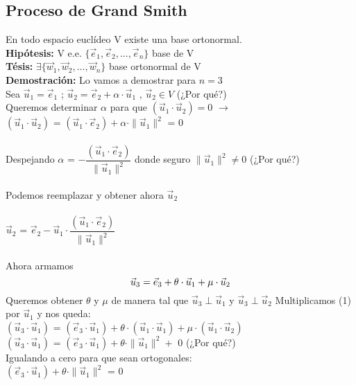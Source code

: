 \documentclass[11pt]{article}
\begin{document}
\subsection{Proceso de Grand Smith}
En todo espacio euclídeo V existe una base ortonormal.\\
\textbf{Hipótesis:} V e.e. $\{\vec{e}_1, \vec{e}_2, \hdots, \vec{e}_n\}$ base de V \\
\textbf{Tésis:} $\exists \{\vec{w}_1, \vec{w}_2, \hdots, \vec{w}_n\}$ base ortonormal de V\\
\textbf{Demostración:} Lo vamos a demostrar para $n=3$\\
Sea $\vec{u}_1 = \vec{e}_1$ ; $\vec{u}_2 = \vec{e}_2 + \alpha\cdot\vec{u}_1$ , $\vec{u}_2 \in V$ (¿Por qué?)\\
Queremos determinar $\alpha$ para que $(\vec{u}_1\cdot\vec{u}_2) = 0$ $\rightarrow$ \\
$(\vec{u}_1\cdot\vec{u}_2)$ = $ (\vec{u}_1\cdot\vec{e}_2) + \alpha\cdot\parallel\vec{u}_1\parallel^2 $ = $0$\\\\
Despejando $\alpha$ = $- \dfrac{(\vec{u}_1\cdot\vec{e}_2)}{\parallel\vec{u}_1\parallel^2}$ \indent donde seguro $\parallel\vec{u}_1\parallel^2 \neq 0$ (¿Por qué?) \\\\
Podemos reemplazar y obtener ahora $\vec{u}_2$\\\\
$\vec{u}_2$ = $\vec{e}_2 - \vec{u}_1 \cdot \dfrac{(\vec{u}_1\cdot\vec{e}_2)}{\parallel\vec{u}_1\parallel^2}$\\\\
Ahora armamos
\begin{equation}
\vec{u}_3 = \vec{e}_3 + \theta \cdot \vec{u}_1 + \mu \cdot \vec{u}_2\\
\end{equation} 
Queremos obtener $\theta$ y $\mu$ de manera tal que $\vec{u}_3\perp\vec{u}_1$ y $\vec{u}_3\perp\vec{u}_2$
\noindent Multiplicamos (1) por $\vec{u}_1$ y nos queda: \\
$(\vec{u}_3\cdot\vec{u}_1)$ = $(\vec{e}_3\cdot\vec{u}_1) + \theta\cdot(\vec{u}_1\cdot\vec{u}_1) + \mu \cdot (\vec{u}_1\cdot\vec{u}_2)$ \\
$(\vec{u}_3\cdot\vec{u}_1)$ = $(\vec{e}_3\cdot\vec{u}_1) + \theta\cdot\parallel\vec{u}_1\parallel^2 +$ $0$ (¿Por qué?)\\
Igualando a cero para que sean ortogonales: \\
$(\vec{e}_3\cdot\vec{u}_1) + \theta\cdot\parallel\vec{u}_1\parallel^2$ = 0\\\\
\end{document}
